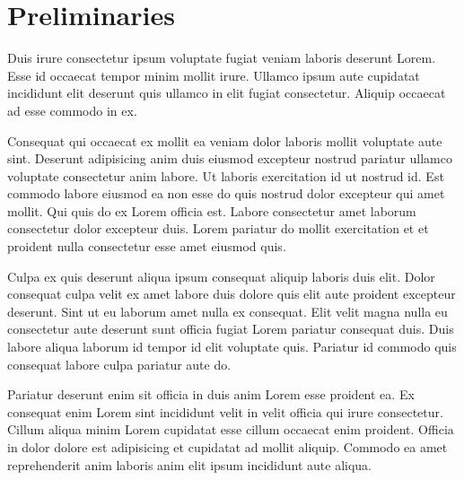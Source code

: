 \section{Preliminaries}
Duis irure consectetur ipsum voluptate fugiat veniam laboris deserunt Lorem. Esse id occaecat tempor minim mollit irure. Ullamco ipsum aute cupidatat incididunt elit deserunt quis ullamco in elit fugiat consectetur. Aliquip occaecat ad esse commodo in ex.

Consequat qui occaecat ex mollit ea veniam dolor laboris mollit voluptate aute sint. Deserunt adipisicing anim duis eiusmod excepteur nostrud pariatur ullamco voluptate consectetur anim labore. Ut laboris exercitation id ut nostrud id. Est commodo labore eiusmod ea non esse do quis nostrud dolor excepteur qui amet mollit. Qui quis do ex Lorem officia est. Labore consectetur amet laborum consectetur dolor excepteur duis. Lorem pariatur do mollit exercitation et et proident nulla consectetur esse amet eiusmod quis.

Culpa ex quis deserunt aliqua ipsum consequat aliquip laboris duis elit. Dolor consequat culpa velit ex amet labore duis dolore quis elit aute proident excepteur deserunt. Sint ut eu laborum amet nulla ex consequat. Elit velit magna nulla eu consectetur aute deserunt sunt officia fugiat Lorem pariatur consequat duis. Duis labore aliqua laborum id tempor id elit voluptate quis. Pariatur id commodo quis consequat labore culpa pariatur aute do.

Pariatur deserunt enim sit officia in duis anim Lorem esse proident ea. Ex consequat enim Lorem sint incididunt velit in velit officia qui irure consectetur. Cillum aliqua minim Lorem cupidatat esse cillum occaecat enim proident. Officia in dolor dolore est adipisicing et cupidatat ad mollit aliquip. Commodo ea amet reprehenderit anim laboris anim elit ipsum incididunt aute aliqua.
